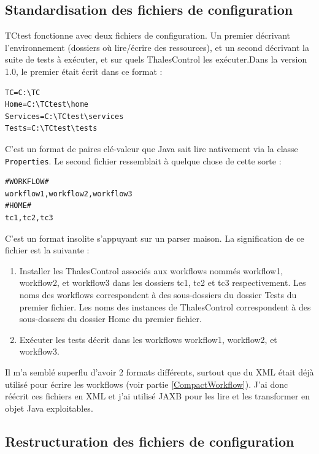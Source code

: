 \subsection{Standardisation des fichiers de configuration}
\label{StandardConfig}

TCtest fonctionne avec deux fichiers de configuration. Un premier 
décrivant l'environnement (dossiers où lire/écrire des ressources), et un 
second décrivant la suite de tests à exécuter, et sur quels ThalesControl les 
exécuter.Dans la version 1.0, le premier était écrit dans ce format :

\begin{verbatim}
TC=C:\TC
Home=C:\TCtest\home
Services=C:\TCtest\services
Tests=C:\TCtest\tests
\end{verbatim}

C'est un format de paires clé-valeur que Java sait lire nativement via la classe
\verb|Properties|. Le second fichier ressemblait à quelque chose de cette 
sorte :

\begin{verbatim}
#WORKFLOW#
workflow1,workflow2,workflow3
#HOME#
tc1,tc2,tc3
\end{verbatim}

C'est un format insolite s'appuyant sur un parser maison. La signification de ce
fichier est la suivante : 
\begin{enumerate}
	\item{Installer les ThalesControl associés aux workflows nommés 
	workflow1, workflow2, et workflow3 dans les dossiers tc1, tc2 et tc3 
	respectivement. Les noms des workflows correspondent à des sous-dossiers du 
	dossier Tests du premier fichier. Les noms des instances de ThalesControl 
	correspondent à des sous-dossers du dossier Home du premier fichier.}
	\item{Exécuter les tests décrit dans les workflows workflow1, workflow2, et 
	workflow3.}
\end{enumerate}

Il m'a semblé superflu d'avoir 2 formats différents, surtout que du XML était 
déjà utilisé pour écrire les workflows (voir partie \ref{CompactWorkflow}). J'ai donc 
réécrit ces fichiers en XML et j'ai utilisé JAXB pour les lire et les 
transformer en objet Java exploitables.

\subsection{Restructuration des fichiers de configuration}

